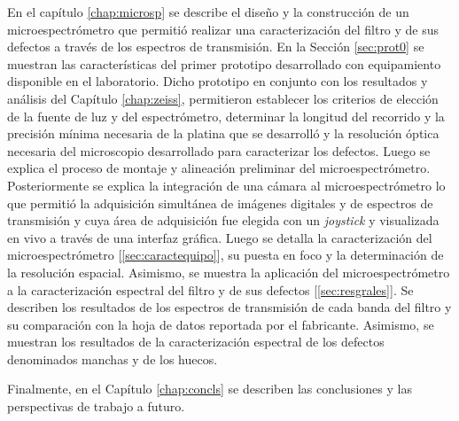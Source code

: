 En el capítulo \ref{chap:microsp} se describe el diseño y la construcción de un microespectrómetro que permitió realizar una caracterización del filtro y de sus defectos a través de los espectros de transmisión. En la Sección \ref{sec:prot0} se muestran las características del primer prototipo desarrollado con equipamiento disponible en el laboratorio. Dicho prototipo en conjunto con los resultados y análisis del Capítulo \ref{chap:zeiss}, permitieron establecer los criterios de elección de la fuente de luz y del espectrómetro, determinar la longitud del recorrido y la precisión mínima necesaria de la platina que se desarrolló y la resolución óptica necesaria del microscopio desarrollado para caracterizar los defectos. Luego se explica el proceso de montaje y alineación preliminar del microespectrómetro. Posteriormente se explica la integración de una cámara al microespectrómetro lo que permitió la adquisición simultánea de imágenes digitales y de espectros de transmisión y cuya área de adquisición fue elegida con un \textit{joystick} y visualizada en vivo a través de una interfaz gráfica. Luego se detalla la caracterización del microespectrómetro [\ref{sec:caractequipo}], su puesta en foco y la determinación de la resolución espacial. Asimismo, se muestra la aplicación del microespectrómetro a la caracterización espectral del filtro y de sus defectos [\ref{sec:resgrales}]. Se describen los resultados de los espectros de transmisión de cada banda del filtro y su comparación con la hoja de datos reportada por el fabricante. Asimismo, se muestran los resultados de la caracterización espectral de los defectos denominados manchas y de los huecos.

Finalmente, en el Capítulo \ref{chap:concls} se describen las conclusiones y las perspectivas de trabajo a futuro.



